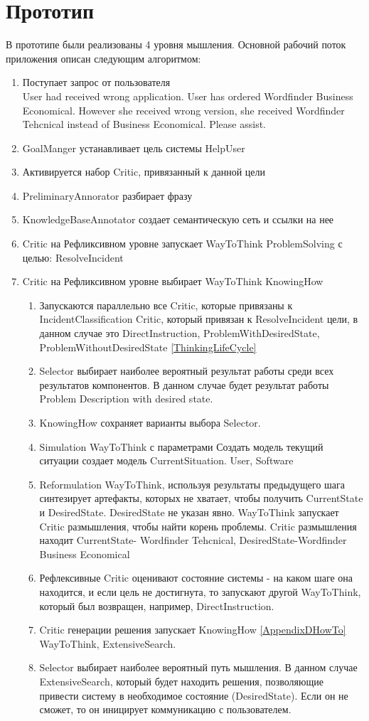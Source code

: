 \section{Прототип}
В прототипе были реализованы 4 уровня мышления. Основной рабочий поток приложения описан следующим алгоритмом:
\begin{enumerate}
	\item Поступает запрос от пользователя \\
	User had received wrong application.
User has ordered Wordfinder Business Economical.
However she received wrong version, she received Wordfinder Tehcnical instead of Business Economical. Please assist.
	\item GoalManger устанавливает цель системы HelpUser
	\item Активируется набор Critic, привязанный к данной цели
	\item PreliminaryAnnorator разбирает фразу
	\item KnowledgeBaseAnnotator создает семантическую сеть и ссылки на нее
	\item Critic на Рефликсивном уровне запускает WayToThink ProblemSolving с целью: ResolveIncident
	\item Critic на Рефликсивном уровне выбирает WayToThink KnowingHow
	\begin{enumerate}
	\item Запускаются параллельно все Critic, которые привязаны к IncidentClassification Critic, который привязан к ResolveIncident цели, в данном случае это DirectInstruction, ProblemWithDesiredState, ProblemWithoutDesiredState \ref{ThinkingLifeCycle}
	\item Selector выбирает наиболее вероятный результат работы среди всех результатов компонентов. В данном случае будет результат работы Problem Description with desired state.
	\item KnowingHow сохраняет варианты выбора Selector.
	\item Simulation WayToThink с параметрами Создать модель текущий ситуации создает модель CurrentSituation. User, Software
	\item Reformulation WayToThink, используя результаты предыдущего шага синтезирует артефакты, которых не хватает, чтобы получить CurrentState и DesiredState. DesiredState не указан явно. WayToThink запускает Critic размышления, чтобы найти корень проблемы. Critic размышления находит CurrentState- Wordfinder Tehcnical, DesiredState-Wordfinder Business Economical
	\item Рефлексивные Critic оценивают состояние системы - на каком шаге она находится, и если цель не достигнута, то запускают другой WayToThink, который был возвращен, например, DirectInstruction. 
	\item Critic генерации решения запускает KnowingHow \ref{AppendixDHowTo} WayToThink, ExtensiveSearch.
	\item Selector выбирает наиболее вероятный путь мышления. В данном случае ExtensiveSearch, который будет находить решения, позволяющие привести систему в необходимое состояние (DesiredState). Если он не сможет, то он иницирует коммуникацию с пользователем. 
	


\end{enumerate}
\end{enumerate}
